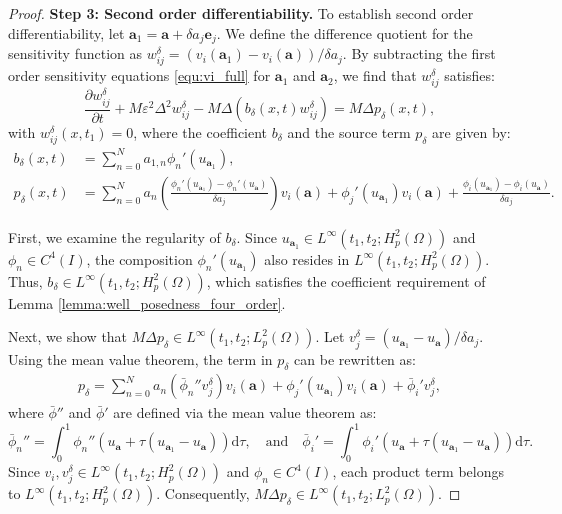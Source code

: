 \documentclass[11pt,reqno]{amsart}
\begin{document}
\begin{proof}
	\textbf{Step 3: Second order differentiability.} To establish second order differentiability, let $\mathbf{a}_1 = \mathbf{a} + \delta a_j \mathbf{e}_j$. We define the difference quotient for the sensitivity function as $w_{ij}^{\delta} = (v_i(\mathbf{a}_1) - v_i(\mathbf{a}))/\delta a_j$. By subtracting the first order sensitivity equations \eqref{equ:vi_full} for $\mathbf{a}_1$ and $\mathbf{a}_2$, we find that $w_{ij}^{\delta}$ satisfies:
	\begin{equation}
		\label{equ:wij_delta_system_refined}
		\frac{\partial w_{ij}^{\delta}}{\partial t} + M\varepsilon^2\Delta^2 w_{ij}^{\delta} - M \Delta \left( b_{\delta}(x,t) w_{ij}^{\delta} \right) =M \Delta p_{\delta}(x,t),
	\end{equation}
	with $w_{ij}^{\delta}(x, t_1) = 0$, where the coefficient $b_{\delta}$ and the source term $p_{\delta}$ are given by:
\begin{align*}
	b_{\delta}(x,t) &= \sum_{n=0}^{N} a_{1,n} \phi_n'(u_{\mathbf{a}_1}), \\
	p_{\delta}(x,t) &=  \sum_{n=0}^{N} a_n \left( \frac{\phi_n'(u_{\mathbf{a}_1}) - \phi_n'(u_{\mathbf{a}})}{\delta a_j} \right) v_i(\mathbf{a}) + \phi_j'(u_{\mathbf{a}_1}) v_i(\mathbf{a}) + \frac{\phi_i(u_{\mathbf{a}_1}) - \phi_i(u_{\mathbf{a}})}{\delta a_j} .
\end{align*}
	
	First, we examine the regularity of $b_{\delta}$. Since $u_{\mathbf{a}_1} \in L^{\infty}(t_1, t_2; H_p^2(\Omega))$ and $\phi_n \in C^4(I)$, the composition $\phi_n'(u_{\mathbf{a}_1})$ also resides in $L^{\infty}(t_1, t_2; H_p^2(\Omega))$. Thus, $b_{\delta} \in L^{\infty}(t_1, t_2; H_p^2(\Omega))$, which satisfies the coefficient requirement of Lemma \ref{lemma:well_posedness_four_order}.
	
	Next, we show that $M \Delta p_{\delta} \in L^{\infty}(t_1, t_2; L_p^2(\Omega))$. Let $v_j^{\delta} = (u_{\mathbf{a}_1} - u_{\mathbf{a}})/\delta a_j$. Using the mean value theorem, the term in $p_{\delta}$ can be rewritten as:
	\begin{align*}
		p_{\delta}  = \sum_{n=0}^{N} a_n \left( \bar{\phi}_n'' v_j^{\delta} \right) v_i(\mathbf{a}) + \phi_j'(u_{\mathbf{a}_1}) v_i(\mathbf{a}) + \bar{\phi}_i' v_j^{\delta},
	\end{align*}
	where $\bar{\phi}''$ and $\bar{\phi}'$ are defined via the mean value theorem as:
	\begin{equation}
		\label{equ:integrated_derivatives}
		\bar{\phi}_n'' = \int_{0}^{1} \phi_n''(u_{\mathbf{a}} + \tau(u_{\mathbf{a}_1} - u_{\mathbf{a}})) \mathrm{d}\tau, \quad \text{and} \quad \bar{\phi}_i' = \int_{0}^{1} \phi_i'(u_{\mathbf{a}} + \tau(u_{\mathbf{a}_1} - u_{\mathbf{a}})) \mathrm{d}\tau.
	\end{equation}
Since $v_i, v_j^{\delta} \in L^{\infty}(t_1, t_2; H_p^2(\Omega))$ and $\phi_n \in C^4(I)$, each product term belongs to $L^{\infty}(t_1, t_2; H_p^2(\Omega))$. Consequently,  $M\Delta p_{\delta} \in L^{\infty}(t_1, t_2; L_p^2(\Omega))$.
	

\end{proof}
\end{document}
